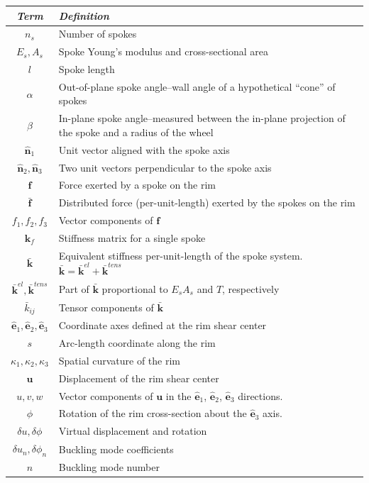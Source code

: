\documentclass{bmd2016p}
\newcommand{\e}{\ensuremath{\hat{\bm{e}}_1}}
\newcommand{\ee}{\ensuremath{\hat{\bm{e}}_2}}
\newcommand{\eee}{\ensuremath{\hat{\bm{e}}_3}}
\newcommand{\n}{\ensuremath{\hat{\bm{n}}_1}}
\newcommand{\nn}{\ensuremath{\hat{\bm{n}}_2}}
\newcommand{\nnn}{\ensuremath{\hat{\bm{n}}_3}}
\begin{document}
\begin{tabular}{c|p{12cm}}
\hline
\textit{\textbf{Term}} & \textit{\textbf{Definition}} \\
\hline
$n_s$		& Number of spokes\\
$E_s, A_s$	& Spoke Young's modulus and cross-sectional area\\
$l$			& Spoke length\\
$\alpha$	& Out-of-plane spoke angle--wall angle of a hypothetical ``cone'' of spokes\\
$\beta$		& In-plane spoke angle--measured between the in-plane projection of the spoke and
			  a radius of the wheel\\
$\n$		& Unit vector aligned with the spoke axis\\
$\nn,\nnn$	& Two unit vectors perpendicular to the spoke axis\\
$\bm{f}$	& Force exerted by a spoke on the rim\\
$\bar{\bm{f}}$& Distributed force (per-unit-length) exerted by the spokes on the rim\\
$f_1, f_2,f_3$ & Vector components of $\bm{f}$\\
$\bm{k}_f$	& Stiffness matrix for a single spoke\\
$\bar{\bm{k}}$ & Equivalent stiffness per-unit-length of the spoke system. $\bar{\bm{k}} = \bar{\bm{k}}^{el} + \bar{\bm{k}}^{tens}$\\
$\bar{\bm{k}}^{el},\bar{\bm{k}}^{tens}$ & Part of $\bar{\bm{k}}$ proportional to $E_sA_s$ and $T$, respectively\\
$\bar{k}_{ij}$ & Tensor components of $\bar{\bm{k}}$\\
$\e,\ee,\eee$ & Coordinate axes defined at the rim shear center\\
$s$			& Arc-length coordinate along the rim\\
$\kappa_1,\kappa_2,\kappa_3$ & Spatial curvature of the rim\\
$\bm{u}$	& Displacement of the rim shear center\\
$u,v,w$		& Vector components of $\bm{u}$ in the \e{}, \ee{}, \eee{} directions.\\
$\phi$		& Rotation of the rim cross-section about the $\hat{\bm{e}}_3$ axis.\\
$\delta u, \delta \phi$ & Virtual displacement and rotation\\
$\delta u_n, \delta\phi_n$ & Buckling mode coefficients\\
$n$			& Buckling mode number\\

\end{tabular}
\end{document}
